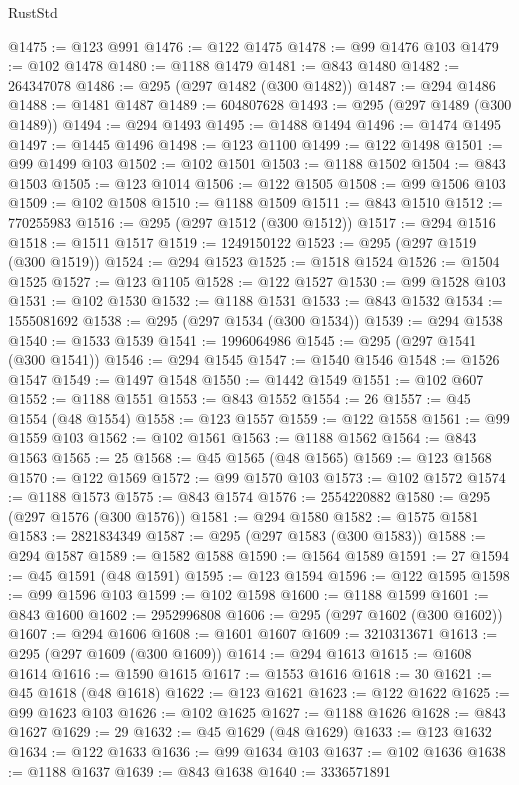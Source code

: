 \begin{lexlean}{RustStd}
\begin{coremodule}
{\begin{coremodule}
{{{{{{{{{{{{{{{{{{{{{{{{{{{{{{{{{@1475 := @123 @991
@1476 := @122 @1475
@1478 := @99 @1476 @103
@1479 := @102 @1478
@1480 := @1188 @1479
@1481 := @843 @1480
@1482 := 264347078
@1486 := @295 (@297 @1482 (@300 @1482))
@1487 := @294 @1486
@1488 := @1481 @1487
@1489 := 604807628
@1493 := @295 (@297 @1489 (@300 @1489))
@1494 := @294 @1493
@1495 := @1488 @1494
@1496 := @1474 @1495
@1497 := @1445 @1496
@1498 := @123 @1100
@1499 := @122 @1498
@1501 := @99 @1499 @103
@1502 := @102 @1501
@1503 := @1188 @1502
@1504 := @843 @1503
@1505 := @123 @1014
@1506 := @122 @1505
@1508 := @99 @1506 @103
@1509 := @102 @1508
@1510 := @1188 @1509
@1511 := @843 @1510
@1512 := 770255983
@1516 := @295 (@297 @1512 (@300 @1512))
@1517 := @294 @1516
@1518 := @1511 @1517
@1519 := 1249150122
@1523 := @295 (@297 @1519 (@300 @1519))
@1524 := @294 @1523
@1525 := @1518 @1524
@1526 := @1504 @1525
@1527 := @123 @1105
@1528 := @122 @1527
@1530 := @99 @1528 @103
@1531 := @102 @1530
@1532 := @1188 @1531
@1533 := @843 @1532
@1534 := 1555081692
@1538 := @295 (@297 @1534 (@300 @1534))
@1539 := @294 @1538
@1540 := @1533 @1539
@1541 := 1996064986
@1545 := @295 (@297 @1541 (@300 @1541))
@1546 := @294 @1545
@1547 := @1540 @1546
@1548 := @1526 @1547
@1549 := @1497 @1548
@1550 := @1442 @1549
@1551 := @102 @607
@1552 := @1188 @1551
@1553 := @843 @1552
@1554 := 26
@1557 := @45 @1554 (@48 @1554)
@1558 := @123 @1557
@1559 := @122 @1558
@1561 := @99 @1559 @103
@1562 := @102 @1561
@1563 := @1188 @1562
@1564 := @843 @1563
@1565 := 25
@1568 := @45 @1565 (@48 @1565)
@1569 := @123 @1568
@1570 := @122 @1569
@1572 := @99 @1570 @103
@1573 := @102 @1572
@1574 := @1188 @1573
@1575 := @843 @1574
@1576 := 2554220882
@1580 := @295 (@297 @1576 (@300 @1576))
@1581 := @294 @1580
@1582 := @1575 @1581
@1583 := 2821834349
@1587 := @295 (@297 @1583 (@300 @1583))
@1588 := @294 @1587
@1589 := @1582 @1588
@1590 := @1564 @1589
@1591 := 27
@1594 := @45 @1591 (@48 @1591)
@1595 := @123 @1594
@1596 := @122 @1595
@1598 := @99 @1596 @103
@1599 := @102 @1598
@1600 := @1188 @1599
@1601 := @843 @1600
@1602 := 2952996808
@1606 := @295 (@297 @1602 (@300 @1602))
@1607 := @294 @1606
@1608 := @1601 @1607
@1609 := 3210313671
@1613 := @295 (@297 @1609 (@300 @1609))
@1614 := @294 @1613
@1615 := @1608 @1614
@1616 := @1590 @1615
@1617 := @1553 @1616
@1618 := 30
@1621 := @45 @1618 (@48 @1618)
@1622 := @123 @1621
@1623 := @122 @1622
@1625 := @99 @1623 @103
@1626 := @102 @1625
@1627 := @1188 @1626
@1628 := @843 @1627
@1629 := 29
@1632 := @45 @1629 (@48 @1629)
@1633 := @123 @1632
@1634 := @122 @1633
@1636 := @99 @1634 @103
@1637 := @102 @1636
@1638 := @1188 @1637
@1639 := @843 @1638
@1640 := 3336571891
}}}}}}}}}}}}}}}}}}}}}}}}}}}}}}}}}
\end{coremodule}}
\end{coremodule}
\end{lexlean}
